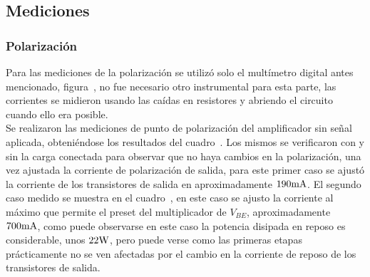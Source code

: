 \subsection{Mediciones}



\subsubsection{Polarización}


Para las mediciones de la polarización se utilizó solo el multímetro digital antes mencionado, figura~, no fue necesario otro instrumental para esta parte, las corrientes se midieron usando las caídas en resistores y abriendo el circuito cuando ello era posible.\\

Se realizaron las mediciones de punto de polarización del amplificador sin señal aplicada, obteniéndose los resultados del cuadro~. Los mismos se verificaron con y sin la carga conectada para observar que no haya cambios en la polarización, una vez ajustada la corriente de polarización de salida, para este primer caso se ajustó la corriente de los transistores de salida en aproximadamente $190 \si[per-mode=symbol]{\milli\ampere}$. El segundo caso medido se muestra en el cuadro~, en este caso se ajusto la corriente al máximo que permite el preset del multiplicador de $V_{BE}$, aproximadamente $700 \si[per-mode=symbol]{\milli\ampere}$, como puede observarse en este caso la potencia disipada en reposo es considerable, unos $22 \si[per-mode=symbol]{\watt}$, pero puede verse como las primeras etapas prácticamente no se ven afectadas por el cambio en la corriente de reposo de los transistores de salida.


\vfill

\clearpage


